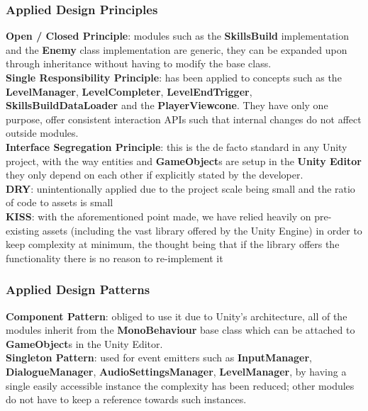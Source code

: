 \documentclass[11pt, a4paper]{article}
\begin{document}
\subsubsection{Applied Design Principles}

\noindent \textbf{Open / Closed Principle}: modules such as the \textbf{SkillsBuild} implementation and the \textbf{Enemy} class implementation are generic, they can be expanded upon through inheritance without having to modify the base class. \\

\noindent \textbf{Single Responsibility Principle}: has been applied to concepts such as the \textbf{LevelManager}, \textbf{LevelCompleter}, \textbf{LevelEndTrigger}, \textbf{SkillsBuildDataLoader} and the \textbf{PlayerViewcone}. They have only one purpose, offer consistent interaction APIs such that internal changes do not affect outside modules. \\

\noindent \textbf{Interface Segregation Principle}: this is the de facto standard in any Unity project, with the way entities and \textbf{GameObject}s are setup in the \textbf{Unity Editor} they only depend on each other if explicitly stated by the developer. \\

\noindent \textbf{DRY}: unintentionally applied due to the project scale being small and the ratio of code to assets is small \\

\noindent \textbf{KISS}: with the aforementioned point made, we have relied heavily on pre-existing assets (including the vast library offered by the Unity Engine) in order to keep complexity at minimum, the thought being that if the library offers the functionality there is no reason to re-implement it

\subsubsection{Applied Design Patterns}

\noindent \textbf{Component Pattern}: obliged to use it due to Unity's architecture, all of the modules inherit from the \textbf{MonoBehaviour} base class which can be attached to \textbf{GameObject}s in the Unity Editor. \\

\noindent \textbf{Singleton Pattern}: used for event emitters such as \textbf{InputManager}, \textbf{DialogueManager}, \textbf{AudioSettingsManager}, \textbf{LevelManager}, by having a single easily accessible instance the complexity has been reduced; other modules do not have to keep a reference towards such instances. \\
\end{document}
